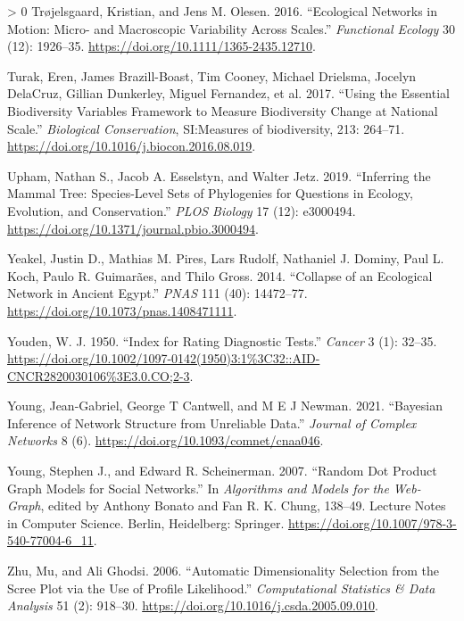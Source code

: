 \documentclass[11pt]{article}
\newlength{\cslhangindent}
\newenvironment{CSLReferences}[3] %
 {%
  \setlength{\parindent}{0pt}
  \ifodd #1 \everypar{\setlength{\hangindent}{\cslhangindent}}\ignorespaces\fi
  \ifnum #2 > 0
  \setlength{\parskip}{#2\baselineskip}
  \fi
 }%
 {}
\begin{document}
\begin{CSLReferences}{1}{0}
\leavevmode\hypertarget{ref-Trojelsgaard2016EcoNet}{}%
Trøjelsgaard, Kristian, and Jens M. Olesen. 2016. {``Ecological Networks
in Motion: Micro- and Macroscopic Variability Across Scales.''}
\emph{Functional Ecology} 30 (12): 1926--35.
\url{https://doi.org/10.1111/1365-2435.12710}.

\leavevmode\hypertarget{ref-Turak2017UsiEss}{}%
Turak, Eren, James Brazill-Boast, Tim Cooney, Michael Drielsma, Jocelyn
DelaCruz, Gillian Dunkerley, Miguel Fernandez, et al. 2017. {``Using the
Essential Biodiversity Variables Framework to Measure Biodiversity
Change at National Scale.''} \emph{Biological Conservation}, SI:Measures
of biodiversity, 213: 264--71.
\url{https://doi.org/10.1016/j.biocon.2016.08.019}.

\leavevmode\hypertarget{ref-Upham2019InfMam}{}%
Upham, Nathan S., Jacob A. Esselstyn, and Walter Jetz. 2019.
{``Inferring the Mammal Tree: Species-Level Sets of Phylogenies for
Questions in Ecology, Evolution, and Conservation.''} \emph{PLOS
Biology} 17 (12): e3000494.
\url{https://doi.org/10.1371/journal.pbio.3000494}.

\leavevmode\hypertarget{ref-Yeakel2014ColEco}{}%
Yeakel, Justin D., Mathias M. Pires, Lars Rudolf, Nathaniel J. Dominy,
Paul L. Koch, Paulo R. Guimarães, and Thilo Gross. 2014. {``Collapse of
an Ecological Network in Ancient Egypt.''} \emph{PNAS} 111 (40):
14472--77. \url{https://doi.org/10.1073/pnas.1408471111}.

\leavevmode\hypertarget{ref-Youden1950IndRat}{}%
Youden, W. J. 1950. {``Index for Rating Diagnostic Tests.''}
\emph{Cancer} 3 (1): 32--35.
\url{https://doi.org/10.1002/1097-0142(1950)3:1\%3C32::AID-CNCR2820030106\%3E3.0.CO;2-3}.

\leavevmode\hypertarget{ref-Young2021BayInf}{}%
Young, Jean-Gabriel, George T Cantwell, and M E J Newman. 2021.
{``Bayesian Inference of Network Structure from Unreliable Data.''}
\emph{Journal of Complex Networks} 8 (6).
\url{https://doi.org/10.1093/comnet/cnaa046}.

\leavevmode\hypertarget{ref-Young2007RanDot}{}%
Young, Stephen J., and Edward R. Scheinerman. 2007. {``Random Dot
Product Graph Models for Social Networks.''} In \emph{Algorithms and
Models for the Web-Graph}, edited by Anthony Bonato and Fan R. K. Chung,
138--49. Lecture Notes in Computer Science. Berlin, Heidelberg:
Springer. \url{https://doi.org/10.1007/978-3-540-77004-6_11}.

\leavevmode\hypertarget{ref-Zhu2006AutDim}{}%
Zhu, Mu, and Ali Ghodsi. 2006. {``Automatic Dimensionality Selection
from the Scree Plot via the Use of Profile Likelihood.''}
\emph{Computational Statistics \& Data Analysis} 51 (2): 918--30.
\url{https://doi.org/10.1016/j.csda.2005.09.010}.

\end{CSLReferences}
\end{document}
